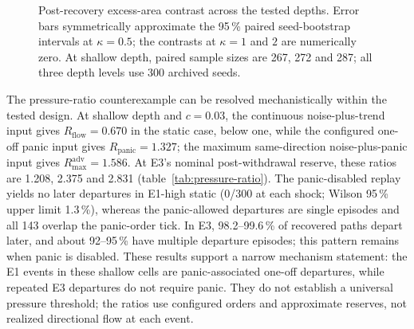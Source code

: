 \begin{figure}[htbp]
\centering
{}
\caption{Post-recovery excess-area contrast across the tested depths. Error bars symmetrically approximate the 95\,\% paired seed-bootstrap intervals at $\kappa=0.5$; the contrasts at $\kappa=1$ and $2$ are numerically zero. At shallow depth, paired sample sizes are 267, 272 and 287; all three depth levels use 300 archived seeds.}
\label{fig:h2-post-recovery}
\end{figure}

The pressure-ratio counterexample can be resolved mechanistically within the tested design. At shallow depth and $c=0.03$, the continuous noise-plus-trend input gives $R_{\mathrm{flow}}=0.670$ in the static case, below one, while the configured one-off panic input gives $R_{\mathrm{panic}}=1.327$; the maximum same-direction noise-plus-panic input gives $R_{\max}^{\mathrm{adv}}=1.586$. At E3's nominal post-withdrawal reserve, these ratios are 1.208, 2.375 and 2.831 (table~\ref{tab:pressure-ratio}). The panic-disabled replay yields no later departures in E1-high static (0/300 at each shock; Wilson 95\,\% upper limit 1.3\,\%), whereas the panic-allowed departures are single episodes and all 143 overlap the panic-order tick. In E3, 98.2--99.6\,\% of recovered paths depart later, and about 92--95\,\% have multiple departure episodes; this pattern remains when panic is disabled. These results support a narrow mechanism statement: the E1 events in these shallow cells are panic-associated one-off departures, while repeated E3 departures do not require panic. They do not establish a universal pressure threshold; the ratios use configured orders and approximate reserves, not realized directional flow at each event.

